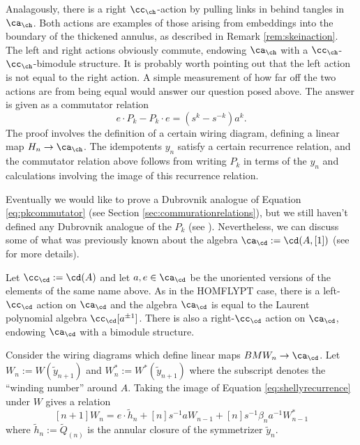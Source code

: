 Analagously, there is a right $\cc_\ch$-action by pulling links in behind tangles in $\ca_\ch$. 
Both actions are examples of those arising from embeddings into the boundary of the thickened annulus, as described in Remark \ref{rem:skeinaction}. The left and right actions obviously commute, endowing $\ca_\ch$ with a $\cc_\ch$-$\cc_\ch$-bimodule structure. It is probably worth pointing out that the left action is not equal to the right action. A simple measurement of how far off the two actions are from being equal would answer our question posed above. The answer is given as a commutator relation 
\begin{equation} \label{eq:pkcommutator}
e \cdot P_k - P_k \cdot e = (s^k - s^{-k}) a^k.
\end{equation}
The proof involves the definition of a certain wiring diagram, defining a linear map $H_n \to \ca_\ch$. The idempotents $y_{n}$ satisfy a certain recurrence relation, and the commutator relation above follows from writing $P_k$ in terms of the $y_n$ and calculations involving the image of this recurrence relation.

Eventually we would like to prove a Dubrovnik analogue of Equation \eqref{eq:pkcommutator} (see Section \ref{sec:commurationrelations}), but we still haven't defined any Dubrovnik analogue of the $P_k$ (see ). Nevertheless, we can discuss some of what was previously known about the algebra $\ca_\cd := \cd(A, [1])$ (see  for more details).

Let $\cc_\cd := \cd(A)$ and let $a, e \in \ca_\cd$ be the unoriented versions of the elements of the same name above. As in the HOMFLYPT case, there is a left-$\cc_\cd$ action on $\ca_\cd$ and the algebra $\ca_\cd$ is equal to the Laurent polynomial algebra $\cc_\cd[a^{\pm 1}]$. There is also a right-$\cc_\cd$ action on $\ca_\cd$, endowing $\ca_\cd$ with a bimodule structure. 

Consider the wiring diagrams
which define linear maps $BMW_n \to \ca_\cd$. Let $W_n := W(\tilde{y}_{n+1})$ and $W^*_n :=  W^*(\tilde{y}_{n+1})$ where the subscript denotes the ``winding number'' around $A$. Taking the image of Equation \eqref{eq:shellyrecurrence} under $W$ gives a relation
\begin{equation} \label{eq:recursionina1}
[n+1] W_n = e \cdot \tilde{h}_n + [n] s^{-1} a W_{n-1} + [n] s^{-1} \beta_n a^{-1} W^*_{n-1}
\end{equation}
where $\tilde{h}_n := \tilde{Q}_{(n)}$ is the annular closure of the symmetrizer $\tilde{y}_n$.

